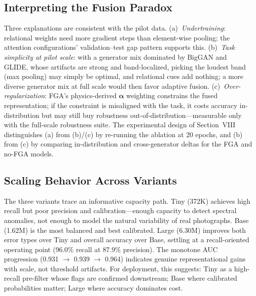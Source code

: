 \documentclass[journal]{IEEEtran}
\begin{document}
\subsection{Interpreting the Fusion Paradox}
Three explanations are consistent with the pilot data. (a)~\emph{Undertraining}: relational weights need more gradient steps than element-wise pooling; the attention configurations' validation--test gap pattern supports this. (b)~\emph{Task simplicity at pilot scale}: with a generator mix dominated by BigGAN and GLIDE, whose artifacts are strong and band-localized, picking the loudest band (max pooling) may simply be optimal, and relational cues add nothing; a more diverse generator mix at full scale would then favor adaptive fusion. (c)~\emph{Over-regularization}: FGA's physics-derived $\boldsymbol{\alpha}$ weighting constrains the fused representation; if the constraint is misaligned with the task, it costs accuracy in-distribution but may still buy robustness out-of-distribution---measurable only with the full-scale robustness suite. The experimental design of Section~VIII distinguishes (a) from (b)/(c) by re-running the ablation at 20 epochs, and (b) from (c) by comparing in-distribution and cross-generator deltas for the FGA and no-FGA models.

\subsection{Scaling Behavior Across Variants}
The three variants trace an informative capacity path. Tiny (372K) achieves high recall but poor precision and calibration---enough capacity to detect spectral anomalies, not enough to model the natural variability of real photographs. Base (1.62M) is the most balanced and best calibrated. Large (6.30M) improves both error types over Tiny and overall accuracy over Base, settling at a recall-oriented operating point (96.0\% recall at 87.9\% precision). The monotone AUC progression (0.931 $\rightarrow$ 0.939 $\rightarrow$ 0.964) indicates genuine representational gains with scale, not threshold artifacts. For deployment, this suggests: Tiny as a high-recall pre-filter whose flags are confirmed downstream; Base where calibrated probabilities matter; Large where accuracy dominates cost.
\end{document}
